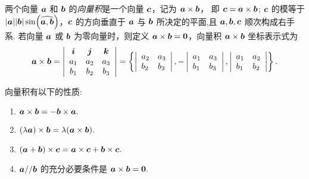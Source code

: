 \begin{definition}
    两个向量 $ \vb*{a} $ 和 $ \vb*{b} $ 的\textit{向量积}是一个向量 $ \vb*{c} $，记为 $ \vb*{a} \times \vb*{b} $，
    即 $ \vb*{c}=\vb*{a} \times \vb*{b}$; $\vb*{c} $ 的模等于 $ |\vb*{a}||\vb*{b}| \sin (\widehat{\vb*{a}, \vb*{b}})$，$\vb*{c} $ 的方向垂直于 $ \vb*{a} $ 与 $ \vb*{b} $ 所决定的平面,且 $ \vb*{a}, \vb*{b}, \vb*{c} $ 顺次构成右手系.
    若向量 $ \vb*{a} $ 或 $ \vb*{b} $ 为零向量时，则定义 $ \vb*{a} \times \vb*{b}=\mathbf{0} $，向量积 $ \vb*{a} \times \vb*{b} $ 坐标表示式为
    $$
        \vb*{a} \times \vb*{b}=\left|\begin{array}{ccc}
            \vb*{i} & \vb*{j} & \vb*{k} \\
            a_{1}   & a_{2}   & a_{3}   \\
            b_{1}   & b_{2}   & b_{3}
        \end{array}\right|=\left\{\left|\begin{array}{ll}
            a_{2} & a_{3} \\
            b_{2} & b_{3}
        \end{array}\right|,-\left|\begin{array}{ll}
            a_{1} & a_{3} \\
            b_{1} & b_{3}
        \end{array}\right|,\left|\begin{array}{ll}
            a_{1} & a_{2} \\
            b_{1} & b_{2}
        \end{array}\right|\right\} .
    $$
\end{definition}

向量积有以下的性质:
\begin{enumerate}[label=(\arabic{*})]
    \item $\vb*{a} \times \vb*{b}=-\vb*{b} \times \vb*{a} .$
    \item $(\lambda \vb*{a}) \times \vb*{b}=\lambda(\vb*{a} \times \vb*{b}) .$
    \item $(\vb*{a}+\vb*{b}) \times \vb*{c}=\vb*{a} \times \vb*{c}+\vb*{b} \times \vb*{c} .$
    \item $\vb*{a} / / \vb*{b} $ 的充分必要条件是 $ \vb*{a} \times \vb*{b}=\mathbf{0} .$
\end{enumerate}


